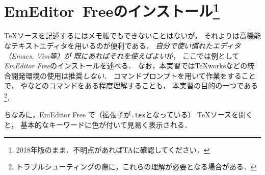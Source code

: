 \documentclass{ltjsarticle}
\begin{document}
\section{EmEditor~Freeのインストール\footnote{%
  2018年版のまま．不明点があればTAに確認してください．
}}
\TeX ソースを記述するにはメモ帳でもできないことはないが，
それよりは高機能なテキストエディタを用いるのが便利である．
\emph{自分で使い慣れたエディタ（Emacs, Vim等）が
  既にあればそれを使えばよい}が，
ここでは例として\emph{EmEditor Free}のインストールを述べる．
なお，本実習では\TeX worksなどの統合開発環境の使用は推奨\emph{しない}．
コマンドプロンプトを用いて作業をすることで，
やなどのコマンドをある程度理解することも，
本実習の目的の一つである\footnote{トラブルシューティングの際に，これらの理解が必要となる場合がある．}．

ちなみに，EmEditor Free で（拡張子が\texttt{.tex}となっている） \TeX ソースを開くと，
基本的なキーワードに色が付いて見易く表示される．
\end{document}

